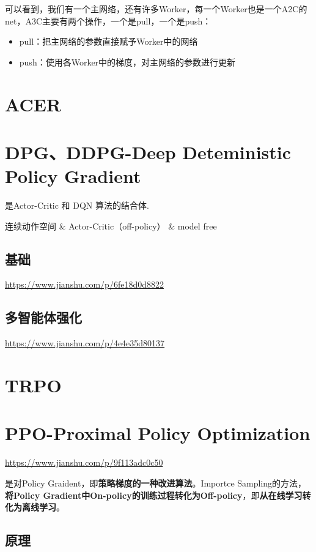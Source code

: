 \documentclass[UTF8,a4paper,12pt]{ctexbook}
\begin{document}
			可以看到，我们有一个主网络，还有许多Worker，每一个Worker也是一个A2C的net，A3C主要有两个操作，一个是pull，一个是push：
			\begin{itemize}
			\item pull：把主网络的参数直接赋予Worker中的网络
			\item push：使用各Worker中的梯度，对主网络的参数进行更新
			\end{itemize}
			
	
	\section{ACER}
		
			
	\section{DPG、DDPG-Deep Deteministic Policy Gradient}
		是Actor-Critic 和 DQN 算法的结合体.
		
		连续动作空间 \& Actor-Critic（off-policy） \& model free
		
		\subsection{基础}
			\url{https://www.jianshu.com/p/6fe18d0d8822}
		
		\subsection{多智能体强化}
			\url{https://www.jianshu.com/p/4e4e35d80137}
			
	\section{TRPO}
		
	
	\section{PPO-Proximal Policy Optimization}
		\url{https://www.jianshu.com/p/9f113adc0c50}
		
		是对Policy Graident，即\textbf{策略梯度的一种改进算法}。Importce Sampling的方法，\textbf{将Policy Gradient中On-policy的训练过程转化为Off-policy}，即\textbf{从在线学习转化为离线学习}。
		
		\subsection{原理}
			
\end{document}
